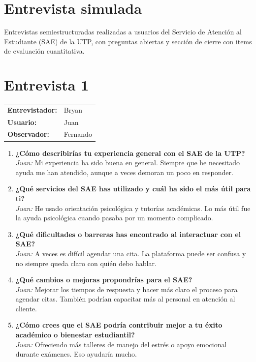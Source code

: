 \documentclass{article}
\begin{document}
\section*{Entrevista simulada}

Entrevistas semiestructuradas realizadas a usuarios del Servicio de Atención al Estudiante (SAE) de la UTP, con preguntas abiertas y sección de cierre con items de evaluación cuantitativa.
\vspace{-0.5cm}
\section*{Entrevista 1}
\begin{tabular}{ll}
\textbf{Entrevistador:} & Bryan \\
\textbf{Usuario:} & Juan \\
\textbf{Observador:} & Fernando \\
\end{tabular}
\vspace{-0.5cm}
\begin{enumerate}[leftmargin=*, label=\textbf{\arabic*.}]
    \item \textbf{¿Cómo describirías tu experiencia general con el SAE de la UTP?} \\
    \textcolor{responsegray}{\textit{Juan:} Mi experiencia ha sido buena en general. Siempre que he necesitado ayuda me han atendido, aunque a veces demoran un poco en responder.}
    
    \item \textbf{¿Qué servicios del SAE has utilizado y cuál ha sido el más útil para ti?} \\
    \textcolor{responsegray}{\textit{Juan:} He usado orientación psicológica y tutorías académicas. Lo más útil fue la ayuda psicológica cuando pasaba por un momento complicado.}
    
    \item \textbf{¿Qué dificultades o barreras has encontrado al interactuar con el SAE?} \\
    \textcolor{responsegray}{\textit{Juan:} A veces es difícil agendar una cita. La plataforma puede ser confusa y no siempre queda claro con quién debo hablar.}
    
    \item \textbf{¿Qué cambios o mejoras propondrías para el SAE?} \\
    \textcolor{responsegray}{\textit{Juan:} Mejorar los tiempos de respuesta y hacer más claro el proceso para agendar citas. También podrían capacitar más al personal en atención al cliente.}
    
    \item \textbf{¿Cómo crees que el SAE podría contribuir mejor a tu éxito académico o bienestar estudiantil?} \\
    \textcolor{responsegray}{\textit{Juan:} Ofreciendo más talleres de manejo del estrés o apoyo emocional durante exámenes. Eso ayudaría mucho.}
\end{enumerate}
\end{document}
